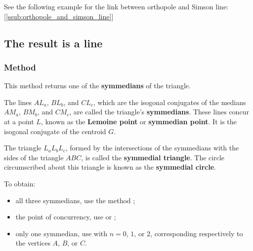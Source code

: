 See the following example for the link between orthopole and Simson line: [\ref{ssub:orthopole_and_simson_line}]

\begin{tkzexample}[latex=.5\textwidth]
\begin{center}
\end{center}
\end{tkzexample}



\subsection{The result is a line}
\subsubsection{Method }
\label{ssub:method_imeth_triangle_symmedian__line}

This method returns one of the \textbf{symmedians} of the triangle.

\medskip
\noindent
The lines $AL_a$, $BL_b$, and $CL_c$, which are the isogonal conjugates of the medians $AM_a$, $BM_b$, and $CM_c$, are called the triangle’s \textbf{symmedians}. These lines concur at a point $L$, known as the \textbf{Lemoine point} or \textbf{symmedian point}. It is the isogonal conjugate of the centroid $G$.

\medskip
\noindent
The triangle $L_aL_bL_c$, formed by the intersections of the symmedians with the sides of the triangle $ABC$, is called the \textbf{symmedial triangle}. The circle circumscribed about this triangle is known as the \textbf{symmedial circle}.

\medskip
\noindent
To obtain:
\begin{itemize}
  \item all three symmedians, use the method ;
  \item the point of concurrency, use  or ;
  \item only one symmedian, use  with \(n=0\), \(1\), or \(2\), corresponding respectively to the vertices $A$, $B$, or $C$.
\end{itemize}

